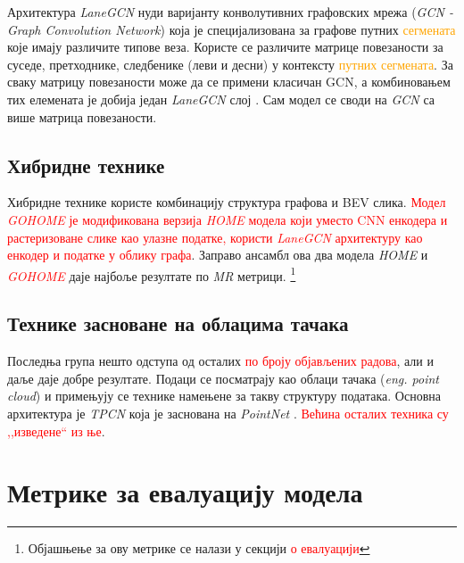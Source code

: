 \documentclass[11pt,oneside]{memoir}
\begin{document}
Архитектура \textit{LaneGCN} нуди варијанту конволутивних графовских мрежа (\textit{GCN - Graph Convolution Network}) \textcolor{orange}{\cite{gcn}}
која је специјализована за графове путних \textcolor{orange}{сегмената} које имају различите типове веза. Користе се различите матрице
повезаности за суседе, претходнике, следбенике (леви и десни) у контексту \textcolor{orange}{путних сегмената}. 
За сваку матрицу повезаности може да се примени класичан GCN, а
комбиновањем тих елемената је добија један \textit{LaneGCN} слој \cite{lanegcn}. Сам модел се своди на \textit{GCN} са више матрица повезаности.

\section{Хибридне технике}

Хибридне технике користе комбинацију структура графова и BEV слика. \textcolor{red}{Модел \textit{GOHOME} је модификована верзија \textit{HOME} 
модела који уместо CNN енкодера и растеризоване слике као улазне податке, користи \textit{LaneGCN} архитектуру као енкодер и податке
у облику графа}. Заправо ансамбл ова два модела \textit{HOME} и \textcolor{red}{\textit{GOHOME}}
даје најбоље резултате по \textit{MR} метрици. \footnote{Објашњење за ову метрике се налази у секцији \textcolor{red}{о евалуацији}}

\section{Технике засноване на облацима тачака}

Последња група нешто одступа од осталих \textcolor{red}{по броју објављених радова}, 
али и даље даје добре резултате. Подаци се посматрају као облаци тачака (\textit{eng. point cloud}) 
и примењују се технике намењене за такву структуру података. Основна
архитектура је \textit{TPCN} \cite{tpcn} која је заснована на \textit{PointNet} \cite{pointnet}. \textcolor{red}{Већина осталих техника су ,,изведене`` из ње}.


\chapter{Метрике за евалуацију модела}
\label{chp:razrada}
\end{document}
